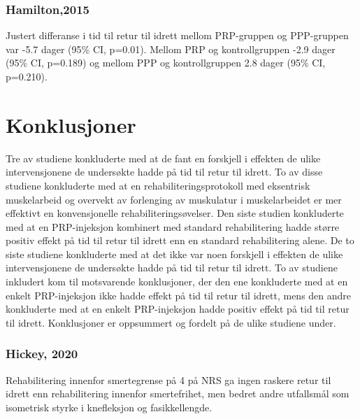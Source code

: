 \documentclass[
]{book}
\begin{document}
\hypertarget{hamilton2015-hamilton2015}{%
\subsubsection{\texorpdfstring{Hamilton,2015 \citep{hamilton2015}}{Hamilton,2015 {[}@hamilton2015{]}}}\label{hamilton2015-hamilton2015}}

Justert differanse i tid til retur til idrett mellom PRP-gruppen og PPP-gruppen var -5.7 dager (95\% CI, p=0.01). Mellom PRP og kontrollgruppen -2.9 dager (95\% CI, p=0.189) og mellom PPP og kontrollgruppen 2.8 dager (95\% CI, p=0.210).

\hypertarget{konklusjoner}{%
\section{Konklusjoner}\label{konklusjoner}}

Tre av studiene konkluderte med at de fant en forskjell i effekten de ulike intervensjonene de undersøkte hadde på tid til retur til idrett\citep{askling2013, askling2014, ahamid2014}. To av disse studiene konkluderte med at en rehabiliteringsprotokoll med eksentrisk muskelarbeid og overvekt av forlenging av muskulatur i muskelarbeidet er mer effektivt en konvensjonelle rehabiliteringsøvelser\citep[\citet{askling2014}]{askling2013}. Den siste studien konkluderte med at en PRP-injeksjon kombinert med standard rehabilitering hadde større positiv effekt på tid til retur til idrett enn en standard rehabilitering alene\citep{ahamid2014}. De to siste studiene konkluderte med at det ikke var noen forskjell i effekten de ulike intervensjonene de undersøkte hadde på tid til retur til idrett\citep[\citet{hamilton2015}]{hickey2020}. To av studiene inkludert kom til motsvarende konklusjoner, der den ene konkluderte med at en enkelt PRP-injeksjon ikke hadde effekt på tid til retur til idrett, mens den andre konkluderte med at en enkelt PRP-injeksjon hadde positiv effekt på tid til retur til idrett\citep[\citet{ahamid2014}]{hamilton2015}. Konklusjoner er oppsummert og fordelt på de ulike studiene under.

\hypertarget{hickey-2020-hickey2020-1}{%
\subsubsection{\texorpdfstring{Hickey, 2020 \citep{hickey2020}}{Hickey, 2020 {[}@hickey2020{]}}}\label{hickey-2020-hickey2020-1}}

Rehabilitering innenfor smertegrense på 4 på NRS ga ingen raskere retur til idrett enn rehabilitering innenfor smertefrihet, men bedret andre utfallsmål som isometrisk styrke i knefleksjon og fasikkellengde.
\end{document}
